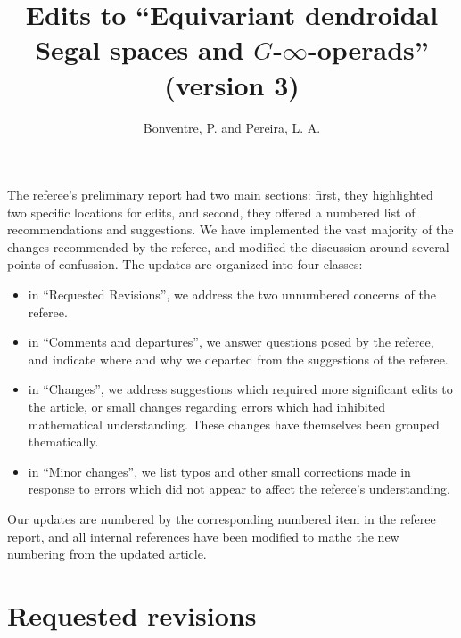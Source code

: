 \documentclass{article}
\begin{document}
 
 
\title{Edits to ``Equivariant dendroidal Segal spaces and $G$-$\infty$-operads'' (version 3)
\\[12pt]} %
 
\author{Bonventre, P. and Pereira, L. A.}
 
\maketitle
 
The referee's preliminary report had two main sections:
first, they highlighted two specific locations for edits, %
and second, they offered a numbered list of recommendations and suggestions.
We have implemented the vast majority of the changes recommended by the referee, and modified the discussion around several points of confussion.
The updates are organized into four classes:
\begin{itemize}
\item in ``Requested Revisions'', we address the two unnumbered concerns of the referee.
\item in ``Comments and departures'', we answer questions posed by the referee, and indicate where and why we departed from the suggestions of the referee.
\item in ``Changes'', we address suggestions which required more significant edits to the article, or small changes regarding errors which had inhibited mathematical understanding. These changes have themselves been grouped thematically.
\item in ``Minor changes'', we list typos and other small corrections made in response to errors which did not appear to affect the referee's understanding.
\end{itemize}

Our updates are numbered by the corresponding numbered item in the referee report,
and all internal references have been modified to mathc the new numbering from the updated article.



\section{Requested revisions}

\end{document}
